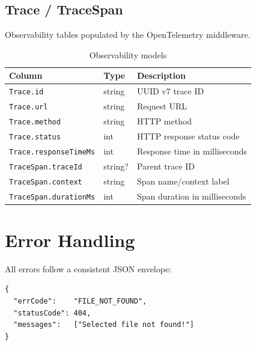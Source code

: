 \documentclass[12pt,a4paper]{article}
\begin{document}
\subsection{Trace / TraceSpan}

Observability tables populated by the OpenTelemetry middleware.

\begin{table}[h!]
\centering
\begin{tabularx}{\linewidth}{llX}
\toprule
\textbf{Column} & \textbf{Type} & \textbf{Description} \\
\midrule
\texttt{Trace.id}             & string      & UUID v7 trace ID \\
\texttt{Trace.url}            & string      & Request URL \\
\texttt{Trace.method}         & string      & HTTP method \\
\texttt{Trace.status}         & int         & HTTP response status code \\
\texttt{Trace.responseTimeMs} & int         & Response time in milliseconds \\
\texttt{TraceSpan.traceId}    & string?     & Parent trace ID \\
\texttt{TraceSpan.context}    & string      & Span name/context label \\
\texttt{TraceSpan.durationMs} & int         & Span duration in milliseconds \\
\bottomrule
\end{tabularx}
\caption{Observability models}
\end{table}

\newpage

\section{Error Handling}

All errors follow a consistent JSON envelope:

\begin{lstlisting}
{
  "errCode":    "FILE_NOT_FOUND",
  "statusCode": 404,
  "messages":   ["Selected file not found!"]
}
\end{lstlisting}
\end{document}
